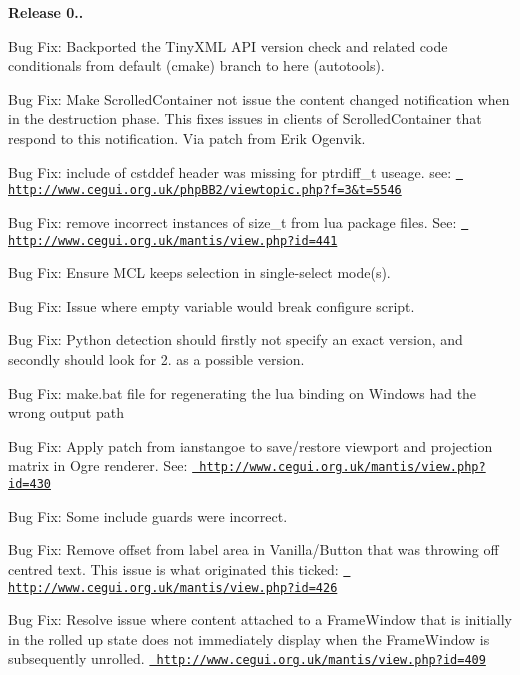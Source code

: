 {\bfseries{Release 0..}}
\begin{DoxyItemize}
\item Bug Fix\+: Backported the Tiny\+X\+ML A\+PI version check and related code conditionals from default (cmake) branch to here (autotools).
\item Bug Fix\+: Make Scrolled\+Container not issue the content changed notification when in the destruction phase. This fixes issues in clients of Scrolled\+Container that respond to this notification. Via patch from Erik Ogenvik.
\item Bug Fix\+: include of cstddef header was missing for ptrdiff\+\_\+t useage. see\+: \href{http://www.cegui.org.uk/phpBB2/viewtopic.php?f=3&t=5546}{\texttt{ http\+://www.\+cegui.\+org.\+uk/php\+B\+B2/viewtopic.\+php?f=3\&t=5546}}
\item Bug Fix\+: remove incorrect instances of \textquotesingle{}size\+\_\+t\textquotesingle{} from lua package files. See\+: \href{http://www.cegui.org.uk/mantis/view.php?id=441}{\texttt{ http\+://www.\+cegui.\+org.\+uk/mantis/view.\+php?id=441}}
\item Bug Fix\+: Ensure M\+CL keeps selection in single-\/select mode(s).
\item Bug Fix\+: Issue where empty variable would break configure script.
\item Bug Fix\+: Python detection should firstly not specify an exact version, and secondly should look for 2. as a possible version.
\item Bug Fix\+: make.\+bat file for regenerating the lua binding on Windows had the wrong output path
\item Bug Fix\+: Apply patch from ianstangoe to save/restore viewport and projection matrix in Ogre renderer. See\+: \href{http://www.cegui.org.uk/mantis/view.php?id=430}{\texttt{ http\+://www.\+cegui.\+org.\+uk/mantis/view.\+php?id=430}}
\item Bug Fix\+: Some include guards were incorrect.
\item Bug Fix\+: Remove offset from label area in Vanilla/\+Button that was throwing off centred text. This issue is what originated this ticked\+: \href{http://www.cegui.org.uk/mantis/view.php?id=426}{\texttt{ http\+://www.\+cegui.\+org.\+uk/mantis/view.\+php?id=426}}
\item Bug Fix\+: Resolve issue where content attached to a Frame\+Window that is initially in the \textquotesingle{}rolled up\textquotesingle{} state does not immediately display when the Frame\+Window is subsequently unrolled. \href{http://www.cegui.org.uk/mantis/view.php?id=409}{\texttt{ http\+://www.\+cegui.\+org.\+uk/mantis/view.\+php?id=409}}

\end{DoxyItemize}
